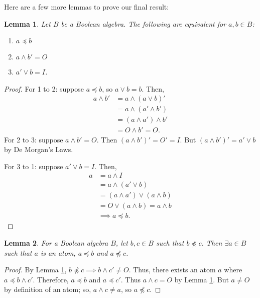 \documentclass[10pt, letterpaper]{article}
\newtheorem{lemma}{Lemma}
\theoremstyle{definition}
\begin{document}
Here are a few more lemmas to prove our final result:
\begin{lemma}\label{lemma_equivalences}
	Let \(B\) be a Boolean algebra. The following are equivalent for \(a,b\in B\):
	\begin{enumerate}
		\item \(a\preceq b\)
		\item \(a\wedge b'=O\)
		\item \(a'\vee b = I\).
	\end{enumerate}
\end{lemma}
\begin{proof}
	For 1 to 2: suppose \(a\preceq b\), so \(a\vee b = b\). Then,
	\begin{align*}
		a\wedge b'&=a\wedge(a\vee b)'\\
				  &=a\wedge(a'\wedge b')\\
				  &=(a\wedge a')\wedge b'\\
				  &=O\wedge b' = O.
	\end{align*}
	For 2 to 3: suppose \(a\wedge b'=O\). Then \((a\wedge b')' = O' = I\).
	But \((a\wedge b')'=a'\vee b\) by De Morgan's Laws.

	For 3 to 1: suppose \(a'\vee b = I\). Then,
	\begin{align*}
		a&=a\wedge I\\
		 &=a\wedge(a'\vee b)\\
		 &=(a\wedge a')\vee (a\wedge b)\\
		 &=O\vee (a\wedge b)=a\wedge b\\
		 &\implies a\preceq b.
	\end{align*}
\end{proof}
\begin{lemma}\label{lemma_atom_must_exist}
	For a Boolean algebra \(B\), let \(b,c\in B\) such that \(b\not\preceq c\). Then
	\(\exists a\in B\) such that \(a\) is an atom, \(a\preceq b\) and \(a\not\preceq c\).
\end{lemma}
\begin{proof}
	By Lemma \ref{lemma_equivalences}, \(b\not\preceq c\implies b\wedge c'\neq O\). 
	Thus, there exists an atom \(a\) where \(a\preceq b\wedge c'\). 
	Therefore, \(a\preceq b\) and \(a\preceq c'\). 
	Thus \(a\wedge c = O\) by Lemma \ref{lemma_equivalences}. 
	But \(a\neq O\) by definition of an atom; so, \(a\wedge c\neq a\), so \(a\not\preceq c\).
\end{proof}
\end{document}
